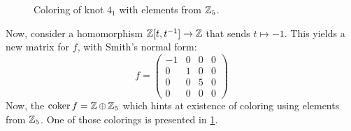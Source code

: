 \begin{example}
\begin{figure}[h]
    \caption{\label{fig:4_1:coloring} Coloring of knot $4_1$ with elements from $\operatorname{\mathbb{Z}}_5$.}
  \end{figure}

  Now, consider a homomorphism $\operatorname{\mathbb{Z}}[t, t^{-1}]\to \operatorname{\mathbb{Z}}$ that sends $t\mapsto -1$. This yields a new matrix for $f$, with Smith's normal form:
  $$f=\begin{pmatrix}
    -1 & 0 & 0 & 0\\ 
    0 & 1 & 0 & 0\\
    0 & 0 & 5 & 0\\ 
    0 & 0 & 0 & 0
  \end{pmatrix}$$
  Now, the $\operatorname{coker} f=\operatorname{\mathbb{Z}}\oplus \operatorname{\mathbb{Z}}_5$ which hints at existence of coloring using elements from $\operatorname{\mathbb{Z}}_5$. One of those colorings is presented in \cref{fig:4_1:coloring}.



\end{example}
